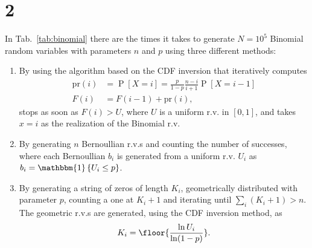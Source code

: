 \documentclass[a4paper,oneside]{article}
\newcommand{\Prob}[1]{\operatorname{P}\left[#1\right]}
\newcommand{\ind}[1]{\operatorname{\mathbbm{1}}\left\{#1\right\}}
\begin{document}
\section*{2}
In Tab.~\ref{tab:binomial} there are the times it takes to generate
$N=10^5$ Binomial random variables with parameters $n$ and $p$ using
three different methods:
\begin{enumerate}
\item By using the algorithm based on the CDF inversion that
  iteratively computes
  \begin{align*}
    \mathrm{pr}(i) &= \Prob{X = i} = \frac{p}{1-p}\frac{n-i}{i+1}\Prob{X = i-1} \\
    F(i) &= F(i-1) + \mathrm{pr}(i) ,
  \end{align*}
  stops as soon as $F(i) > U$, where $U$ is a uniform r.v. in $[0,
    1]$, and takes $x = i$ as the realization of the Binomial r.v.
  \item By generating $n$ Bernoullian r.v.s and counting the number of
    successes, where each Bernoullian $b_i$ is generated from a uniform
    r.v. $U_i$ as $b_i = \ind{U_i \leq p}$.
  \item By generating a string of zeros of length $K_i$, geometrically
    distributed with parameter $p$, counting a one at $K_i+1$ and
    iterating until $\sum_i \left( K_i + 1 \right) > n$. The geometric
    r.v.s are generated, using the CDF inversion method, as
    \[ K_i = \floor{\frac{\ln U_i}{\ln (1 - p)}} . \]
\end{enumerate}
\end{document}
